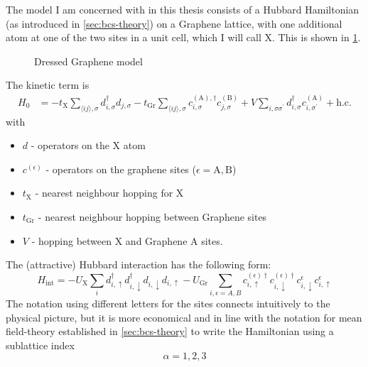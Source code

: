 \documentclass[../notes.tex]{subfiles}
\begin{document}
The model I am concerned with in this thesis consists of a Hubbard Hamiltonian (as introduced in \cref{sec:bcs-theory}) on a Graphene lattice, with one additional atom at one of the two sites in a unit cell, which I will call X\@.
This is shown in \cref{fig:eg-x model}.
\begin{figure}[tb]
	\centering
	
	\caption{Dressed Graphene model}
	\label{fig:eg-x model}
\end{figure}
The kinetic term is
\begin{align}
	H_0 &= -t_{\mathrm{X}} \sum_{\langle ij \rangle, \sigma} d_{i, \sigma}^{\dagger} d_{j, \sigma}
	-t_{\mathrm{Gr}} \sum_{\langle ij \rangle, \sigma}
	c_{i, \sigma}^{(\mathrm{A}), \dagger} c_{j, \sigma}^{(\mathrm{B})}
	+ V \sum_{i, \sigma \sigma^{\prime}}
	d_{i, \sigma}^{\dagger} c_{i, \sigma^{\prime}}^{(\mathrm{A})} + \mathrm{h.c.}
	\label{eq:EG-X model Hamiltonian non-interacting}
\end{align}
with
\begin{itemize}
	\item \(d\) - operators on the X atom
	\item \(c^{(\epsilon)}\) - operators on the graphene sites (\(\epsilon = \mathrm{A}, \mathrm{B}\))
	\item \(t_{\mathrm{X}}\) - nearest neighbour hopping for X
	\item \(t_{\mathrm{Gr}}\) - nearest neighbour hopping between Graphene sites
	\item \(V\) - hopping between \(\mathrm{X}\) and Graphene \(\mathrm{A}\) sites.
\end{itemize}
The (attractive) Hubbard interaction has the following form:
\begin{equation}
	H_{\mathrm{int}} = -U_{\mathrm{X}} \sum_{i} d_{i, \uparrow}^{\dagger} d_{i, \downarrow}^{\dagger} d_{i, \downarrow} d_{i, \uparrow}
	- U_{\mathrm{Gr}} \sum_{i, \epsilon=A, B} c_{i, \uparrow}^{(\epsilon) \dagger} c_{i, \downarrow}^{(\epsilon) \dagger} c_{i, \downarrow}^{\epsilon} c_{i, \uparrow}^{\epsilon}
\end{equation}
The notation using different letters for the sites connects intuitively to the physical picture, but it is more economical and in line with the notation for mean field-theory established in \cref{sec:bcs-theory} to write the Hamiltonian using a sublattice index
\begin{equation}
	\alpha = 1, 2, 3
\end{equation}
\end{document}
